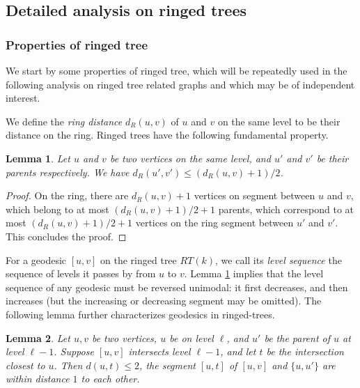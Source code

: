 \documentclass[11pt]{article}
\newtheorem{lem}{Lemma}
\begin{document}
\subsection{Detailed analysis on ringed trees} 
\label{sec:rtproof}

\subsubsection{Properties of ringed tree}

We start by some properties of ringed tree, which will be repeatedly used in the following analysis on ringed tree related graphs and which may be of independent interest.

We define the \emph{ring distance} $d_R(u,v)$ of $u$ and $v$ 
	on the same level to be their distance on the ring. 
Ringed trees have the following fundamental property.

\begin{lem}\label{lem:ringed-dist-growth}
Let $u$ and $v$ be two vertices on the same level,  
	and $u'$ and $v'$ be their parents respectively.
We have $d_R(u',v') \leq (d_R(u,v)+1)/2$.
\end{lem}

\begin{proof}
On the ring, there are $d_R(u,v)+1$ vertices on segment between $u$ and $v$, 
	which belong to at most $(d_R(u,v)+1)/2+1$ parents, which
	correspond to at most $(d_R(u,v)+1)/2+1$ vertices on the ring segment 
	between $u'$ and $v'$. This concludes the proof.
\end{proof}

For a geodesic $[u,v]$ on the ringed tree $RT(k)$, 
	we call its \emph{level sequence} the sequence of levels it passes by
	from $u$ to $v$. 
Lemma \ref{lem:ringed-dist-growth} implies that the level sequence 
	of any geodesic must be reversed unimodal: it first decreases, 
	and then increases (but the increasing or decreasing segment
	may be omitted).
The following lemma further characterizes geodesics in ringed-trees.

\begin{lem}\label{lem:ringed-tree-flipping}
Let $u,v$ be two vertices, $u$ be on level $\ell$, and $u'$ be
	the parent of $u$ at level $\ell-1$. 
Suppose $[u,v]$ intersects level $\ell-1$, and let $t$ be the intersection closest to $u$. Then $d(u,t) \leq 2$, the segment $[u,t]$ of $[u,v]$ and 
	$\{ u,u'\}$ are within distance $1$ to each other.
\end{lem}
\end{document}
